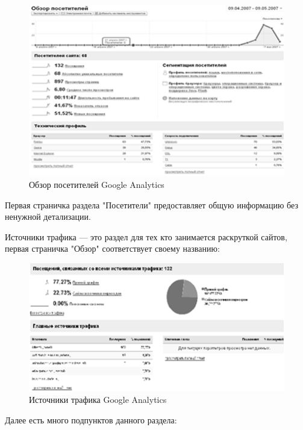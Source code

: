 \documentclass[a4paper,english,russian]{G2-105}
\begin{document}
\begin{figure}
    \includegraphics[width=\linewidth]{ris4.png}
    \caption{Обзор посетителей Google Analytics}
	\label{ris4}
\end{figure}
\par Первая страничка раздела "Посетители" предоставляет общую информацию без ненужной детализации.
\par Источники трафика --- это раздел для тех кто занимается раскруткой сайтов, первая страничка "Обзор" соответствует своему названию:
\begin{figure}
    \includegraphics[width=\linewidth]{ris5.png}
    \caption{Источники трафика Google Analytics}
	\label{ris5}
\end{figure}
\par Далее есть много подпунктов данного раздела:
\end{document}
